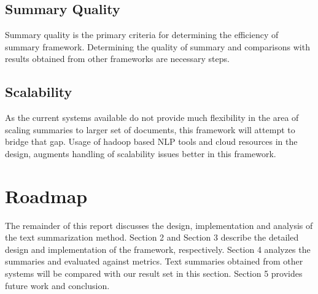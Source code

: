 \subsection{Summary Quality}
Summary quality is the primary criteria for determining the efficiency of summary framework. Determining the quality of summary and
comparisons with results obtained from other frameworks are necessary steps.
\subsection{Scalability}
As the current systems available do not provide much flexibility in the area of scaling summaries to larger set of documents,
this framework will attempt to bridge that gap. Usage of hadoop based NLP tools and cloud resources in the design, augments handling
of scalability issues better in this framework.

\section{Roadmap}
The remainder of this report discusses the design, implementation and analysis of the text summarization method.
Section 2 and Section 3 describe the detailed design and implementation of the framework, respectively.
Section 4 analyzes the summaries and evaluated against metrics. Text summaries obtained from other systems will be compared
with our result set in this section. Section 5 provides future work and conclusion.
